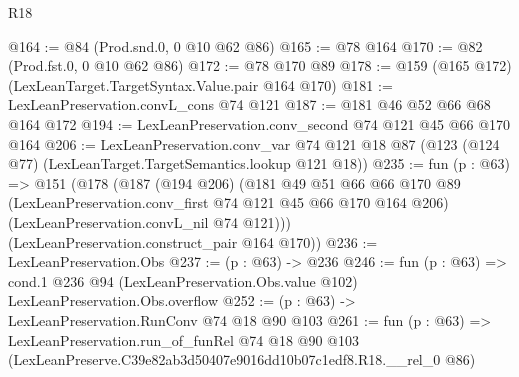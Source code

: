 \begin{lexlean}{R18}
\begin{coremodule}
@164 := @84 (Prod.snd.{0, 0} @10 @62 @86)
@165 := @78 @164
@170 := @82 (Prod.fst.{0, 0} @10 @62 @86)
@172 := @78 @170 @89
@178 := @159 (@165 @172) (LexLeanTarget.TargetSyntax.Value.pair @164 @170)
@181 := LexLeanPreservation.convL_cons @74 @121
@187 := @181 @46 @52 @66 @68 @164 @172
@194 := LexLeanPreservation.conv_second @74 @121 @45 @66 @170 @164
@206 := LexLeanPreservation.conv_var
    @74
    @121
    @18
    @87
    (@123 (@124 @77) (LexLeanTarget.TargetSemantics.lookup @121 @18))
@235 := fun (p : @63) =>
  @151
    (@178
      (@187
        (@194 @206)
        (@181
          @49
          @51
          @66
          @66
          @170
          @89
          (LexLeanPreservation.conv_first @74 @121 @45 @66 @170 @164 @206)
          (LexLeanPreservation.convL_nil @74 @121)))
      (LexLeanPreservation.construct_pair @164 @170))
@236 := LexLeanPreservation.Obs
@237 := (p : @63) -> @236
@246 := fun (p : @63) =>
  cond.{1} @236 @94 (LexLeanPreservation.Obs.value @102) LexLeanPreservation.Obs.overflow
@252 := (p : @63) -> LexLeanPreservation.RunConv @74 @18 @90 @103
@261 := fun (p : @63) =>
  LexLeanPreservation.run_of_funRel
    @74
    @18
    @90
    @103
    (LexLeanPreserve.C39e82ab3d50407e9016dd10b07c1edf8.R18.__rel_0 @86)
\end{coremodule}
\end{lexlean}
